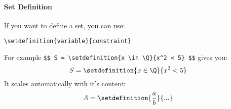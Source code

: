 \paragraph{Set Definition}

If you want to define a set, you can use:
\begin{center}\verb|\setdefinition{variable}{constraint}|\end{center}
For example \verb|$$ S = \setdefinition{x \in \Q}{x^2 < 5} $$| gives you:
$$ S = \setdefinition{x \in \Q}{x^2 < 5} $$
It scales automatically with it's content:
$$ A = \setdefinition{\frac{a}{b}}{...} $$


